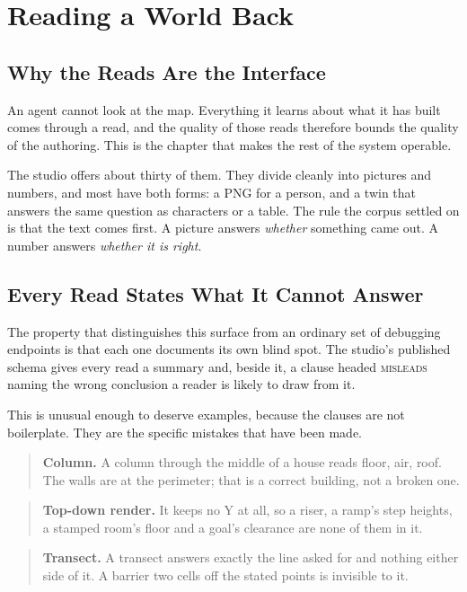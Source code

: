 \chapter{Reading a World Back}
\label{ch:reading}

\section{Why the Reads Are the Interface}

An agent cannot look at the map. Everything it learns about what it has built comes
through a read, and the quality of those reads therefore bounds the quality of the
authoring. This is the chapter that makes the rest of the system operable.

The studio offers about thirty of them. They divide cleanly into pictures and
numbers, and most have both forms: a PNG for a person, and a 
twin that answers the same question as characters or a table. The rule the corpus
settled on is that the text comes first. A picture answers \emph{whether} something
came out. A number answers \emph{whether it is right}.

\section{Every Read States What It Cannot Answer}

The property that distinguishes this surface from an ordinary set of debugging
endpoints is that each one documents its own blind spot. The studio's published
schema gives every read a summary and, beside it, a clause headed \textsc{misleads}
naming the wrong conclusion a reader is likely to draw from it.

This is unusual enough to deserve examples, because the clauses are not
boilerplate. They are the specific mistakes that have been made.

\begin{quote}
\textbf{Column.} A column through the middle of a house reads floor, air, roof. The
walls are at the perimeter; that is a correct building, not a broken one.
\end{quote}

\begin{quote}
\textbf{Top-down render.} It keeps no Y at all, so a riser, a ramp's step heights, a
stamped room's floor and a goal's clearance are none of them in it.
\end{quote}

\begin{quote}
\textbf{Transect.} A transect answers exactly the line asked for and nothing either
side of it. A barrier two cells off the stated points is invisible to it.
\end{quote}

